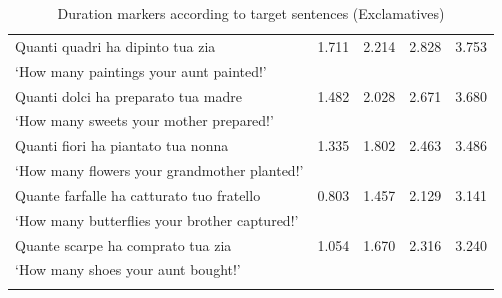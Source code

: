 \documentclass[output=paper]{langsci/langscibook}
\begin{document}
\begin{table}
{\begin{tabular}{lrrrr}
Quanti quadri ha dipinto tua zia                               & 1.711  &  2.214         & 2.828         & 3.753         \\
`How many paintings your aunt painted!’                        &        &                &               &               \\
Quanti dolci ha preparato tua madre                            & 1.482  &  2.028         & 2.671         & 3.680         \\
`How many sweets your mother prepared!’                        &        &                &               &               \\
Quanti fiori ha piantato tua nonna                             & 1.335  &  1.802         & 2.463         & 3.486         \\
`How many flowers your grandmother planted!’                    &        &                &               &               \\
Quante farfalle ha catturato tuo fratello                      & 0.803  &  1.457         & 2.129         & 3.141         \\
`How many butterflies your brother captured!’                  &        &                &               &               \\
Quante scarpe ha comprato tua zia                              & 1.054  &  1.670         & 2.316         & 3.240         \\
`How many shoes your aunt bought!’                             &        &                &               &     \\
\lspbottomrule
\end{tabular}
}
\caption{Duration markers according to target sentences (Exclamatives)}
\label{tab:kel:4}
\end{table}


\clearpage


{\sloppy
\printbibliography[heading=subbibliography,notkeyword=this]
}
\end{document}
